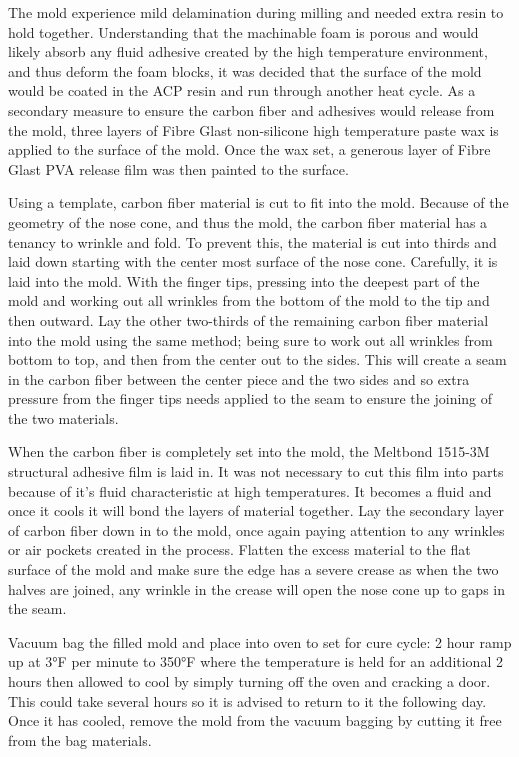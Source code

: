 \documentclass{aiaa-tc}%
\begin{document}
The mold experience mild delamination during milling and needed extra resin to hold together. Understanding that the machinable foam is porous and would likely absorb any fluid adhesive created by the high temperature environment, and thus deform the foam blocks, it was decided that the surface of the mold would be coated in the ACP resin and run through another heat cycle. As a secondary measure to ensure the carbon fiber and adhesives would release from the mold, three layers of Fibre Glast non-silicone high temperature paste wax is applied to the surface of the mold. Once the wax set, a generous layer of Fibre Glast PVA release film was then painted to the surface. 

Using a template, carbon fiber material is cut to fit into the mold. Because of the geometry of the nose cone, and thus the mold, the carbon fiber material has a tenancy to wrinkle and fold. To prevent this, the material is cut into thirds and laid down starting with the center most surface of the nose cone. Carefully, it is laid into the mold. With the finger tips, pressing into the deepest part of the mold and working out all wrinkles from the bottom of the mold to the tip and then outward. Lay the other two-thirds of the remaining carbon fiber material into the mold using the same method; being sure to work out all wrinkles from bottom to top, and then from the center out to the sides. This will create a seam in the carbon fiber between the center piece and the two sides and so extra pressure from the finger tips needs applied to the seam to ensure the joining of the two materials.

When the carbon fiber is completely set into the mold, the Meltbond 1515-3M structural adhesive film is laid in. It was not necessary to cut this film into parts because of it's fluid characteristic at high temperatures. It becomes a fluid and once it cools it will bond the layers of material together. Lay the secondary layer of carbon fiber down in to the mold, once again paying attention to any wrinkles or air pockets created in the process. Flatten the excess material to the flat surface of the mold and make sure the edge has a severe crease as when the two halves are joined, any wrinkle in the crease will open the nose cone up to gaps in the seam.

Vacuum bag the filled mold and place into oven to set for cure cycle: 2 hour ramp up at 3°F per minute to 350°F where the temperature is held for an additional 2 hours then allowed to cool by simply turning off the oven and cracking a door. This could take several hours so it is advised to return to it the following day. Once it has cooled, remove the mold from the vacuum bagging by cutting it free from the bag materials. 
\end{document}
